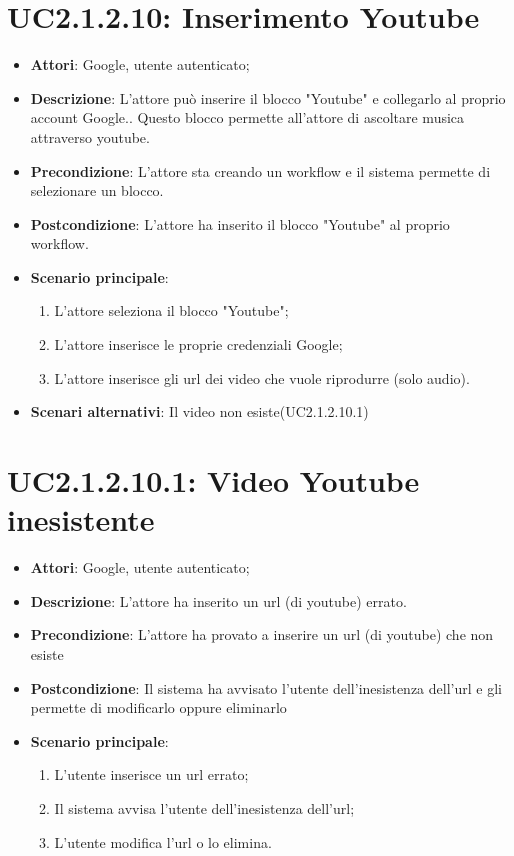 \section{UC2.1.2.10: Inserimento Youtube}
\label{UC2.1.2.10}
\begin{itemize}
	\item \textbf{Attori}: Google, utente autenticato;
	\item \textbf{Descrizione}: L'attore può inserire il blocco "Youtube" e collegarlo al proprio account Google.. Questo blocco permette all'attore di ascoltare musica attraverso youtube.
	\item \textbf{Precondizione}: L'attore sta creando un workflow e il sistema permette di selezionare un blocco.
	\item \textbf{Postcondizione}: L'attore ha inserito il blocco "Youtube" al proprio workflow.
	\item \textbf{Scenario principale}:
	\begin{enumerate} \item L'attore seleziona il blocco "Youtube";  \item  L'attore inserisce le proprie credenziali Google;  \item  L'attore inserisce gli url dei video che vuole riprodurre (solo audio).\end{enumerate}
	\item \textbf{Scenari alternativi}:
	Il video non esiste(UC2.1.2.10.1)
\end{itemize}

\section{UC2.1.2.10.1: Video Youtube inesistente}
\label{UC2.1.2.10.1}
\begin{itemize}
	\item \textbf{Attori}: Google, utente autenticato;
	\item \textbf{Descrizione}: L'attore ha inserito un url (di youtube) errato.
	\item \textbf{Precondizione}: L'attore ha provato a inserire un url (di youtube) che non esiste
	\item \textbf{Postcondizione}: Il sistema ha avvisato l'utente dell'inesistenza dell'url e gli permette di modificarlo oppure eliminarlo
	\item \textbf{Scenario principale}:
	\begin{enumerate} \item L'utente inserisce un url errato;  \item  Il sistema avvisa l'utente dell'inesistenza dell'url;  \item  L'utente modifica l'url o lo elimina.\end{enumerate}
\end{itemize}

